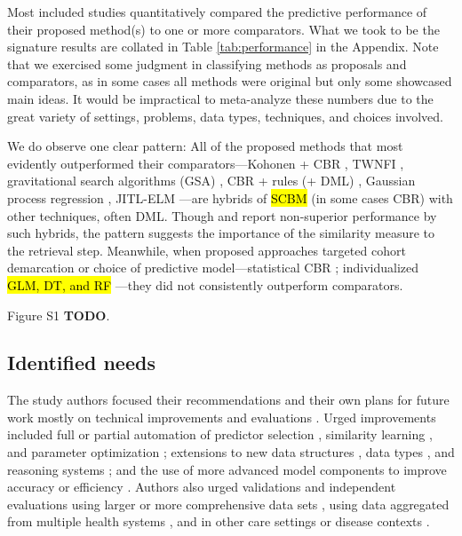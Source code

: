 \documentclass[sn-mathphys,Numbered,pdflatex]{sn-jnl}
\theoremstyle{remark}
\theoremstyle{definition}
\begin{document}
Most included studies quantitatively compared the predictive performance
of their proposed method(s) to one or more comparators. What we took to
be the signature results are collated in Table \ref{tab:performance} in
the Appendix. Note that we exercised some judgment in classifying
methods as proposals and comparators, as in some cases all methods were
original but only some showcased main ideas. It would be impractical to
meta-analyze these numbers due to the great variety of settings,
problems, data types, techniques, and choices involved.

We do observe one clear pattern: All of the proposed methods that most
evidently outperformed their comparators---Kohonen + CBR
\citep{Wyns2004}, TWNFI \citep{Song2006, Kasabov2010}, gravitational
search algorithms (GSA) \citep{Liang2015}, CBR + rules (+ DML)
\citep{Nicolas2014}, Gaussian process regression \citep{Zhang2018},
JITL-ELM \citep{Ma2020}---are hybrids of \hl{SCBM} (in some cases CBR)
with other techniques, often DML. Though \citet{CampilloGimenez2013} and
\citet{Ng2015} report non-superior performance by such hybrids, the
pattern suggests the importance of the similarity measure to the
retrieval step. Meanwhile, when proposed approaches targeted cohort
demarcation or choice of predictive model---statistical CBR
\citep{Park2006}; individualized \hl{GLM, DT, and RF}
\citep{Lee2015, Lee2017}---they did not consistently outperform
comparators.

Figure S1 \textbf{TODO}.

\subsection{Identified needs}\label{identified-needs}

The study authors focused their recommendations and their own plans for
future work mostly on technical improvements and evaluations
\citep{Mariuzzi1997, Yearwood1997}. Urged improvements included full or
partial automation of predictor selection
\citep{Mariuzzi1997, Yearwood1997}, similarity learning
\citep{Mariuzzi1997, Wang2019}, and parameter optimization
\citep{Song2006, Lee2017}; extensions to new data structures
\citep{Lopez2011}, data types \citep{Liang2015, Verma2015, Malykh2018},
and reasoning systems \citep{Nicolas2014}; and the use of more advanced
model components to improve accuracy or efficiency
\citep{Lowsky2013, Lee2015, Liang2015, Zhang2018}. Authors also urged
validations and independent evaluations using larger or more
comprehensive data sets \citep{Elter2007, Xu2008, Verma2015, Ng2015},
using data aggregated from multiple health systems
\citep{Lee2015, Lee2017, Tang2021, Ng2021}, and in other care settings
or disease contexts \citep{Song2006, Zhang2018, Tang2021, Ng2021}.
\end{document}
